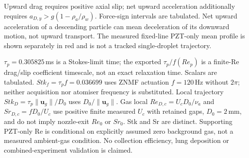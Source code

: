 Upward drag requires positive axial slip; net upward acceleration additionally
requires $a_{D,y}>g(1-\rho_a/\rho_w)$. Force-sign intervals are tabulated.
Net upward acceleration of a descending particle can mean deceleration of its
downward motion, not upward transport. The measured fixed-line PZT-only mean
profile is shown separately in red and is not a tracked single-droplet trajectory.

$\tau_p=0.305825\,$ms is a Stokes-limit time; the exported
$\tau_p/f(Re_p)$ is a finite-Re drag/slip coefficient timescale, not an exact
relaxation time. Scalars are tabulated. $Stk_f=\tau_p f=0.036699$ uses
ZNMF actuation $f=120\,$Hz without $2\pi$; neither acquisition
nor atomiser frequency is substituted. Local trajectory $Stk_D=\tau_p\lVert\boldsymbol u_g\rVert/D_0$
uses $D_0/\lVert\boldsymbol u_g\rVert$. Gas local $Re_{D,c}=U_cD_0/\nu_a$
and $Sr_{D,c}=fD_0/U_c$ use positive finite measured $U_c$ with retained gaps,
$D_0=2\,$mm, and do not imply nozzle-exit $Re_0$ or $Sr_0$. Stk and Sr are
distinct. Supporting PZT-only Re is conditional on explicitly assumed zero
background gas, not a measured ambient-gas condition. No collection efficiency,
lung deposition or combined-experiment validation is claimed.
